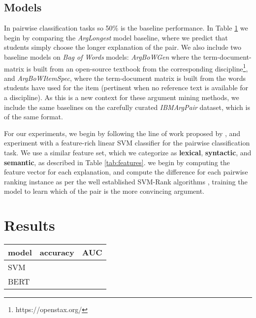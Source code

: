 \documentclass[runningheads]{llncs}
\begin{document}
\subsection{Models}


\begin{figure}
	\hfill
	\label{tab:baselines}
\end{figure}


In pairwise classification tasks so 50\% is the baseline performance.  
In Table \ref{tab:baselines} we begin by comparing the \textit{ArgLongest} 
model baseline, where we predict that students simply choose the longer 
explanation of the pair.
We also include two baseline models on \textit{Bag of Words} models: 
\textit{ArgBoWGen} where the term-document-matrix is built from an open-source 
textbook from the corresponding discipline\footnote{https://openstax.org/}, and 
\textit{ArgBoWItemSpec}, where the term-document matrix is built from the words 
students have used for the item (pertinent when no reference text is available 
for a discipline).
As this is a new context for these argument mining methods, we include the same 
baselines on the carefully curated \textit{IBMArgPair} dataset, which is of the 
same format.



For our experiments, we begin by following the line of work proposed by 
\cite{habernal_which_2016}, and experiment with a feature-rich linear SVM 
classifier for the pairwise classification task. We use a similar feature set, 
which we categorize as \textbf{lexical}, \textbf{syntactic}, and 
\textbf{semantic}, as described in Table \ref{tab:features}. we begin by 
computing the feature vector for each explanation, and compute the difference 
for each pairwise ranking instance as per the well established SVM-Rank 
algorithms \cite{joachims_optimizing_2002}, training the model to learn which 
of the pair is the more convincing argument. 


\section{Results}
\begin{table}
	\begin{tabular}{l|l|l}
		\toprule
		model & accuracy & AUC \\
		\toprule
		SVM &  &  \\
		BERT & & \\	
	\end{tabular}
\end{table}
\end{document}
